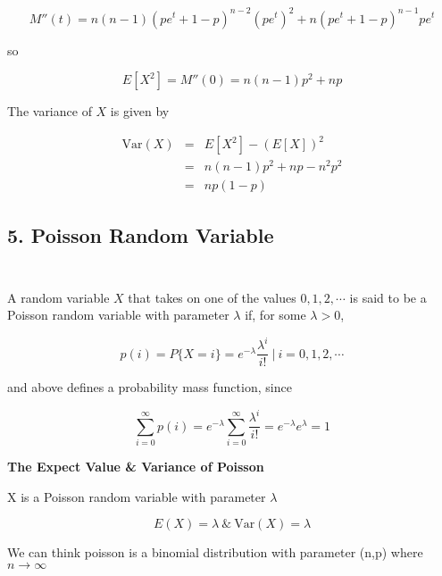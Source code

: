 $$M''(t) = n(n - 1)(pe^t + 1 - p)^{n-2}(pe^t)^2 + n(pe^t + 1 - p)^{n-1}pe^t$$

so

$$E[X^2] = M''(0) = n(n-1)p^2 + np$$

The variance of $X$ is given by

\begin{eqnarray*}
	\text{Var}(X) &=& E[X^2] - (E[X])^2\\
	& = & n(n - 1)p^2 + np - n^2p^2\\
	& = & np(1 - p)
\end{eqnarray*}
\newpage

\subsection*{5. Poisson Random Variable}$ $

$ $

\begin{defn}
	A random variable $X$ that takes on one of the values $0,1,2,\cdots$ is said to be a Poisson random variable with parameter $\lambda$ if, for some $\lambda > 0$,
	
	$$p(i) = P\{X = i\} = e^{-\lambda}\dfrac{\lambda^i}{i!} ~|~ i = 0,1,2,\cdots$$
	
	and above defines a probability mass function, since
	
	$$\sum^{\infty}_{i = 0}p(i) = e^{-\lambda}\sum^{\infty}_{i=0}\dfrac{\lambda^i}{i!} = e^{-\lambda}e^{\lambda} = 1$$
\end{defn}

\textbf{The Expect Value \& Variance of Poisson}

X is a Poisson random variable with parameter $\lambda$

$$E(X) = \lambda ~\&~ \text{Var}(X) = \lambda$$

\begin{thm*}
	We can think poisson is a binomial distribution with parameter (n,p) where $n \rightarrow \infty$
\end{thm*}

